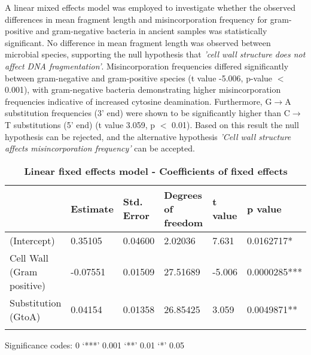 \documentclass[12pt, a4paper]{article}
\renewcommand{\arraystretch}{1.2}
\newcommand{\ra}[1]{\renewcommand{\arraystretch}{#1}}
\begin{document}
A linear mixed effects model was employed to investigate whether the observed differences in mean fragment length and misincorporation frequency for gram-positive and gram-negative bacteria in ancient samples was statistically significant.
No difference in mean fragment length was observed between microbial species, supporting the null hypothesis that \textit{'cell wall structure does not affect DNA fragmentation'}.
Misincorporation frequencies differed significantly between gram-negative and gram-positive species (t value -5.006, p-value $<$ 0.001), with gram-negative bacteria demonstrating higher misincorporation frequencies indicative of increased cytosine deamination. 
Furthermore, G$\to$A substitution frequencies (3' end) were shown to be significantly higher than C$\to$T substitutions (5' end)  (t value 3.059, p $<$ 0.01).
Based on this result the null hypothesis can be rejected, and the alternative hypothesis \textit{'Cell wall structure affects misincorporation frequency'} can be accepted.\\

\begin{table*}[h]\centering\small %
\ra{1.5}
\setlength{\tabcolsep}{6pt} %
\caption[Linear fixed effects model - Coefficients of fixed effects]{\textbf{Linear fixed effects model - Coefficients of fixed effects}}\label{table:stats output}
\centering
\begin{tabular}{@{}R{3cm} R{2cm} R{2cm} R{2cm} R{1.5cm} L{3cm}@{}}
  \toprule
 & Estimate & Std. Error & Degrees of freedom & t value & p value \\ 
  \midrule
(Intercept) & 0.35105 & 0.04600 & 2.02036 & 7.631 & 0.0162717* \\ 
  Cell Wall \newline(Gram positive) & -0.07551 & 0.01509 & 27.51689 & -5.006 & 0.0000285*** \\ 
  Substitution (GtoA) & 0.04154 & 0.01358 & 26.85425 & 3.059 & 0.0049871** \\ 
   \bottomrule\\
\end{tabular}
   Significance codes:  0 ‘***’ 0.001 ‘**’ 0.01 ‘*’ 0.05
\end{table*}
\clearpage
\end{document}
